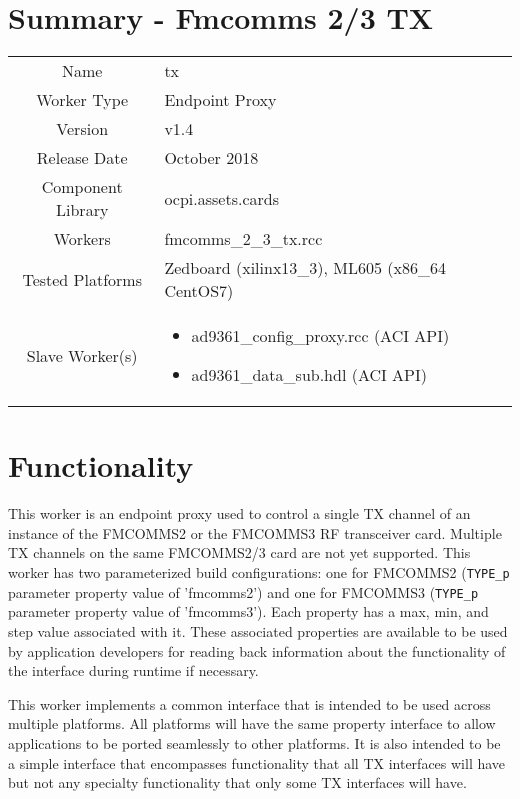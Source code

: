 \documentclass{article}
\author{} %
\date{Version \docVersion} %
\title{\docTitle}
\def\docVersion{1.4}
\def\comp{tx}
\def\Comp{Fmcomms 2/3 TX}
\begin{document}
\section*{Summary - \Comp}
\begin{tabular}{|c|M{13.5cm}|}
	\hline
	                  &                                        \\
	\hline
	Name              & \comp                                  \\
	\hline
	Worker Type       & Endpoint Proxy                         \\
	\hline
	Version           & v\docVersion \\
	\hline
	Release Date      & October 2018 \\
	\hline
	Component Library & ocpi.assets.cards \\
	\hline
	Workers           & fmcomms\_2\_3\_tx.rcc               \\
	\hline
	Tested Platforms  & Zedboard (xilinx13\_3), ML605 (x86\_64 CentOS7)                             \\
	\hline
	Slave Worker(s)   &
    \begin{itemize}
      \item ad9361\_config\_proxy.rcc (ACI API)
      \item ad9361\_data\_sub.hdl (ACI API)
    \end{itemize} \\
	\hline
\end{tabular}

\section*{Functionality}

	This worker is an endpoint proxy used to control a single TX channel of an instance of the FMCOMMS2 or the FMCOMMS3 RF transceiver card. Multiple TX channels on the same FMCOMMS2/3 card are not yet supported. This worker has two parameterized build configurations: one for FMCOMMS2 (\verb+TYPE_p+ parameter property value of 'fmcomms2') and one for FMCOMMS3 (\verb+TYPE_p+ parameter property value of 'fmcomms3'). Each property has a max, min, and step value associated with it.  These associated properties are available to be used by application developers for reading back information about the functionality of the interface during runtime if necessary.\par\medskip
\noindent This worker implements a common interface that is intended to be used across multiple platforms. All platforms will have the same property interface to allow applications to be ported seamlessly to other platforms. It is also intended to be a simple interface that encompasses functionality that all TX interfaces will have but not any specialty functionality that only some TX interfaces will have.\par\medskip
\end{document}
